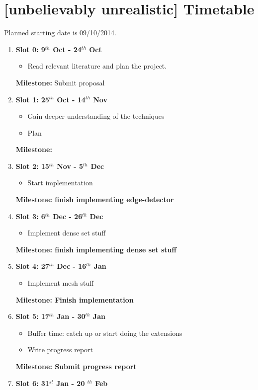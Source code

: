 \section*{[unbelievably unrealistic] Timetable}

Planned starting date is 09/10/2014.

\begin{enumerate}

\item {\bf Slot 0: 9$^{th}$ Oct - 24$^{th}$ Oct}
	\begin{itemize}
		\item Read relevant literature and plan the project.
	\end{itemize}
	{\bf Milestone:} Submit proposal
\item {\bf Slot 1: 25$^{th}$ Oct - 14$^{th}$ Nov}
	\begin{itemize}
		\item Gain deeper understanding of the techniques
		\item Plan
	\end{itemize}
	{\bf Milestone:} 
\item {\bf Slot 2: 15$^{th}$ Nov  - 5$^{th}$ Dec}
	\begin{itemize}
		\item Start implementation 
	\end{itemize}
	{\bf Milestone: finish implementing edge-detector} 
\item {\bf Slot 3: 6$^{th}$ Dec -  26$^{th}$ Dec}
	\begin{itemize}
		\item Implement dense set stuff
	\end{itemize}
	{\bf Milestone: finish implementing dense set stuff} 
\item {\bf Slot 4: 27$^{th}$ Dec - 16$^{th}$ Jan}
	\begin{itemize}
		\item Implement mesh stuff
	\end{itemize}
	{\bf Milestone: Finish implementation} 
\item {\bf Slot 5: 17$^{th}$ Jan  - 30$^{th}$ Jan}
	\begin{itemize}
		\item Buffer time: catch up or start doing the extensions
		\item Write progress report
	\end{itemize}
	{\bf Milestone: Submit progress report} 
\item {\bf Slot 6: 31$^{st}$ Jan - 20 $^{th}$ Feb}
	\begin{itemize}

\end{itemize}
\end{enumerate}
